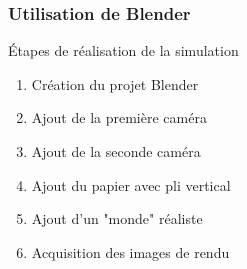 \documentclass[8pt]{beamer}
\begin{document}
	\begin{frame}
		\frametitle{Utilisation de Blender}
		\begin{minipage}[c]{.35\textwidth}
			\begin{block}{\'Etapes de réalisation de la simulation}
				\begin{enumerate}
					\item<1-> Création du projet Blender
					\item<2-> Ajout de la première caméra
					\item<3-> Ajout de la seconde caméra
					\item<4-> Ajout du papier avec pli vertical
					\item<5-> Ajout d'un "monde" réaliste\footnotemark
					\item<6-> Acquisition des images de rendu
				\end{enumerate}
			\end{block}
		\end{minipage}\hfill
		\begin{minipage}[c]{.6\textwidth}\centering
\end{minipage}
\end{frame}
\end{document}
